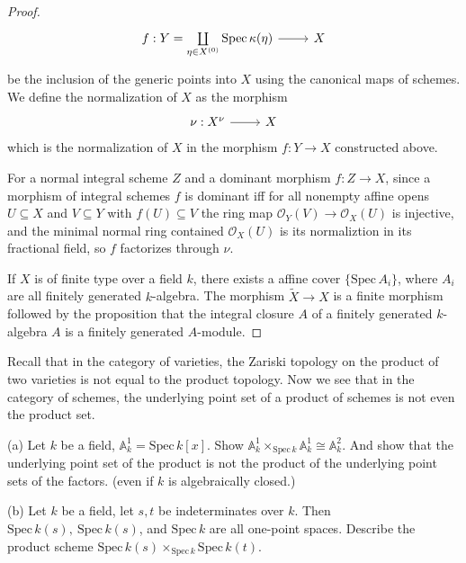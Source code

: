 \begin{proof}
	\begin{equation*}
		\begin{tikzcd}
			f: Y=\coprod\limits_{\eta \in X^{(0)}} \operatorname{Spec}\kappa(\eta) \arrow[r] & X
		\end{tikzcd}
	\end{equation*}
	be the inclusion of the generic points into $X$ using the canonical maps of schemes.  
	We define the normalization of $X$ as the morphism
	\begin{equation*}
		\begin{tikzcd}
			\nu: X^{\nu} \arrow[r] & X
		\end{tikzcd}
	\end{equation*}
	which is the normalization of $X$ in the morphism $f: Y \rightarrow X$ constructed above.
	
	For a normal integral scheme $Z$ and a dominant morphism $f: Z \rightarrow X$,  since a morphism of integral schemes $f$ is dominant  iff for all nonempty affine opens $U \subseteq X$ and $V \subseteq Y$ with $f(U) \subseteq V$ the ring map $\mathcal{O}_{Y}(V) \rightarrow \mathcal{O}_{X}(U)$ is injective,  and the minimal normal ring contained $\mathcal{O}_{X}(U)$ is its normaliztion in its fractional field,  so $f$ factorizes through $\nu$.
	
	If $X$ is of finite type over a field $k$,  there exists a affine cover $\{\mathrm{Spec}\,A_{i}\}$,  where $A_{i}$ are all finitely generated $k$-algebra.  The morphism $\widetilde{X} \rightarrow X$ is a finite morphism followed by the proposition that the integral closure $A$ of a finitely generated $k$-algebra $A$ is a finitely generated $A$-module.
\end{proof}
\begin{exe}
	\label{2.3.9}
	Recall that in the category of varieties, the Zariski topology on the product of two varieties is not equal to the product topology. Now we see that in the category of schemes, the underlying point set of a product of schemes is not even the product set.
	
	(a) Let $k$ be a field, $\mathbb{A}_k^1=\mathrm{Spec}\, k[x]$. Show $\mathbb{A}_k^1 \times_{\mathrm{Spec}\, k} \mathbb{A}_k^1\cong \mathbb{A}_k^2$. And show that the underlying
	point set of the product is not the product of the underlying point sets of the factors. (even if $k$ is algebraically closed.)
	
	(b) Let $k$ be a field, let $s,t$ be indeterminates over $k$. Then $\mathrm{Spec}\,k(s),\ \mathrm{Spec}\,k(s)$, and $\mathrm{Spec}\,k$ are all one-point spaces. Describe the product scheme $\mathrm{Spec}\, k(s)\times_{\mathrm{Spec}\, k}\mathrm{Spec}\, k(t)$.
\end{exe}

